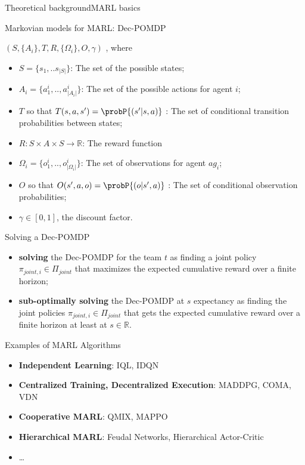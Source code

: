 \begin{frame}[allowframebreaks]{Theoretical background}{MARL basics}
\begin{block}{Markovian models for MARL: Dec-POMDP}
        \

        { \footnotesize

        $(S,\{A_i\},T,R,\{\Omega_i\},O,\gamma)$ , where
        \begin{itemize}
            \item $S = \{s_1, ..s_{|S|}\}$: The set of the possible states;
            \item $A_{i} = \{a_{1}^{i},..,a_{|A_{i}|}^{i}\}$: The set of the possible actions for agent $i$;
            \item $T$ so that $T(s,a,s') = \probP{(s'|s,a)}$ : The set of conditional transition probabilities between states;
            \item $R: S \times A \times S \rightarrow \mathbb{R}$: The reward function
            \item $\Omega_{i} = \{o_{1}^{i},..,o_{|\Omega_{i}|}^{i}\}$: The set of observations for agent $ag_i$;
            \item $O$ so that $O(s',a,o) = \probP{(o|s',a)}$ : The set of conditional observation probabilities;
            \item $\gamma \in [0,1]$, the discount factor.
        \end{itemize}

        }

    \end{block}

    \begin{block}{Solving a Dec-POMDP}
        \begin{itemize}
            \item \textbf{solving} the Dec-POMDP for the team $t$ as finding a joint policy $\pi_{joint,i} \in \Pi_{joint}$ that maximizes the expected cumulative reward over a finite horizon;
            \item \textbf{sub-optimally solving} the Dec-POMDP at $s$ expectancy as finding the joint policies $\pi_{joint,i} \in \Pi_{joint}$ that gets the expected cumulative reward over a finite horizon at least at $s \in \mathbb{R}$.
        \end{itemize}
    \end{block}

    \begin{exampleblock}{Examples of MARL Algorithms}
        \begin{itemize}
            \item \textbf{Independent Learning}: IQL, IDQN
            \item \textbf{Centralized Training, Decentralized Execution}: MADDPG, COMA, VDN
            \item \textbf{Cooperative MARL}: QMIX, MAPPO
            \item \textbf{Hierarchical MARL}: Feudal Networks, Hierarchical Actor-Critic
            \item \dots
        \end{itemize}
    \end{exampleblock}

\end{frame}
